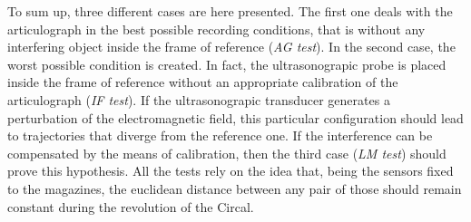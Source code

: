 To sum up, three different cases are here presented. 
The first one deals with the articulograph in the best possible recording
conditions, that is without any interfering object inside the frame of 
reference (\emph{AG test}).
In the second case, the worst possible condition is created. In fact, the
ultrasonograpic probe is placed inside the frame of reference without an
appropriate calibration of the articulograph (\emph{IF test}).
If the ultrasonograpic transducer generates a perturbation of the
electromagnetic field, this particular configuration should lead to 
trajectories that diverge from the reference one.
If the interference can be compensated by the means of calibration, then the
third case (\emph{LM test}) should prove this hypothesis.
All the tests rely on the idea that, being the sensors fixed to the magazines,
the euclidean distance between any pair of those should remain constant during
the revolution of the Circal.

